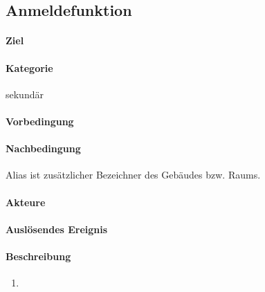 \subsection{Anmeldefunktion}
\label{Anmeldefunktion}
\paragraph{Ziel}

\paragraph{Kategorie}
sekundär
\paragraph{Vorbedingung}

\paragraph{Nachbedingung}
Alias ist zusätzlicher Bezeichner des Gebäudes bzw. Raums.
\paragraph{Akteure}

\paragraph{Auslösendes Ereignis}

\paragraph{Beschreibung}
\begin{enumerate}
    \item 
\end{enumerate}
